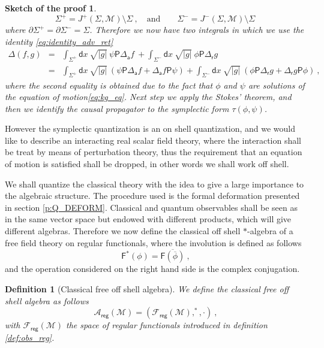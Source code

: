 \documentclass[11pt]{book}
\newcommand{\reg}{\mathsf{reg}}
\newcommand{\abs}[1]{\left|#1\right|}
\newcommand{\Acal}{\mathcal{A}}
\newcommand{\Fcal}{\mathcal{F}}
\newcommand{\Mcal}{\mathcal{M}}
\newcommand{\Fsf}{\mathsf{F}}
\newcommand{\Psf}{\mathsf{P}}
\newcommand{\asf}{\mathsf{a}}
\newcommand{\dsf}{\mathsf{d}}
\newcommand{\rsf}{\mathsf{r}}
\theoremstyle{break}
\newtheorem{definition}{Definition}[chapter]
\newtheorem*{sketch}{Sketch of the proof}[chapter]
\begin{document}
\begin{sketch}
%
\begin{equation*}
\Sigma^+ = J^+(\Sigma,\Mcal) \setminus \Sigma \ , \quad \mbox{and} \qquad \Sigma^- = J^-(\Sigma,\Mcal) \setminus \Sigma \ 
\end{equation*}
%
where $\partial \Sigma^+ = \partial \Sigma^- = \Sigma$. 
Therefore we now have  two integrals in which we use the identity \eqref{eq:identity_adv_ret}
%
\begin{eqnarray*}
\Delta(f,g) &=& \int_{\Sigma^+} \dsf x \ \sqrt{\abs{g}} \ \psi \Psf \Delta_\asf f \ + \int_{\Sigma^-} \dsf x \ \sqrt{\abs{g}} \ \phi \Psf \Delta_\rsf g \\
%
&=& 
\int_{\Sigma^+} \dsf x \ \sqrt{\abs{g}} \ 
\left( \psi \Psf \Delta_\asf f + \Delta_\asf f \Psf \psi \right) 
+ 
\int_{\Sigma^-} \dsf x \ \sqrt{\abs{g}} \ 
\left( \phi \Psf \Delta_\rsf g + \Delta_\rsf g \Psf \phi \right) \ ,
\end{eqnarray*}
%
where the second equality is obtained due to the fact that $\phi$ and $\psi$ are solutions of the equation of motion\eqref{eq:kg_eq}. Next step we apply the Stokes' theorem, and then we identify the causal propagator to the symplectic form $\tau(\phi,\psi)$.
\end{sketch}


However the symplectic quantization is an on shell quantization, and we would like to describe an interacting real scalar field theory, where the interaction shall be treat by means of perturbation theory, thus the requirement that an equation of motion is satisfied shall be dropped, in other words we shall work off shell. 


We shall quantize the classical theory with the idea to give a large importance to the algebraic structure. The procedure used is the formal deformation presented in section \ref{p:Q_DEFORM}. Classical and quantum observables shall be seen as in the same vector space but endowed with different products, which will give different algebras. Therefore we now define the classical off shell $\ast$-algebra of a free field theory on regular functionals, where the involution is defined as follows
%
\begin{equation}
\Fsf^\ast(\phi) =  \overline{\Fsf(\overline{\phi})} \ , 
\label{eq:involution}
\end{equation}
%
and the operation considered on the right hand side is the complex conjugation. 


\begin{definition}[Classical free off shell algebra]\label{def:alg_clas}
We define the classical free off shell algebra as follows
%
\begin{equation}
\Acal_\reg(\Mcal) = \left(\Fcal_\reg(\Mcal), ^\ast , \cdot\right) \ ,
\label{eq:alg_clas}
\end{equation}
%
with $\Fcal_\reg(\Mcal)$ the space of regular functionals introduced in definition \ref{def:obs_reg}.
\end{definition}
\end{document}
